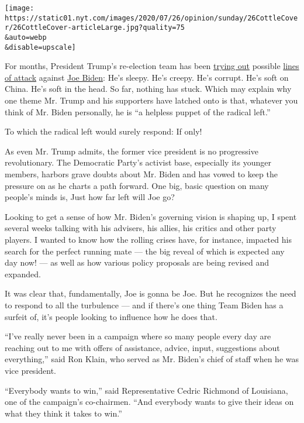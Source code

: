 \texttt{[image: https://static01.nyt.com/images/2020/07/26/opinion/sunday/26CottleCover/26CottleCover-articleLarge.jpg?quality=75\\\&auto=webp\\\&disable=upscale]}

For months, President Trump's re-election team has been
\href{https://apnews.com/698d634366a78b7197a14784605c76a8}{trying out}
possible
\href{https://www.theatlantic.com/ideas/archive/2020/06/trump-cant-figure-out-how-attack-biden/613402/}{lines
of attack} against
\href{https://www.nytimes.com/2020/07/24/business/joe-biden-stocks-taxes.html}{Joe
Biden}: He's sleepy. He's creepy. He's corrupt. He's soft on China. He's
soft in the head. So far, nothing has stuck. Which may explain why one
theme Mr. Trump and his supporters have latched onto is that, whatever
you think of Mr. Biden personally, he is ``a helpless puppet of the
radical left.''

To which the radical left would surely respond: If only!

As even Mr. Trump admits, the former vice president is no progressive
revolutionary. The Democratic Party's activist base, especially its
younger members, harbors grave doubts about Mr. Biden and has vowed to
keep the pressure on as he charts a path forward. One big, basic
question on many people's minds is, Just how far left will Joe go?

Looking to get a sense of how Mr. Biden's governing vision is shaping
up, I spent several weeks talking with his advisers, his allies, his
critics and other party players. I wanted to know how the rolling crises
have, for instance, impacted his search for the perfect running mate ---
the big reveal of which is expected any day now! --- as well as how
various policy proposals are being revised and expanded.

It was clear that, fundamentally, Joe is gonna be Joe. But he recognizes
the need to respond to all the turbulence --- and if there's one thing
Team Biden has a surfeit of, it's people looking to influence how he
does that.

``I've really never been in a campaign where so many people every day
are reaching out to me with offers of assistance, advice, input,
suggestions about everything,'' said Ron Klain, who served as Mr.
Biden's chief of staff when he was vice president.

``Everybody wants to win,'' said Representative Cedric Richmond of
Louisiana, one of the campaign's co-chairmen. ``And everybody wants to
give their ideas on what they think it takes to win.''

